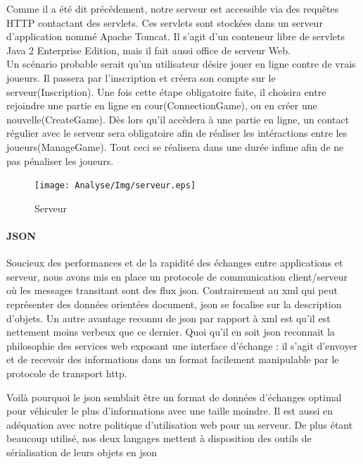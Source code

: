 		
		Comme il a été dit précédement, notre serveur est accessible via des requêtes
		HTTP contactant des servlets. Ces servlets sont stockées dans un serveur
		d'application nommé Apache Tomcat. Il s'agit d'un conteneur libre de
		servlets Java 2 Enterprise Edition, mais il fait aussi office de serveur
		Web.\\
		Un scénario probable serait qu'un utilisateur désire jouer
		en ligne contre de vrais joueurs. 
		Il passera par l'inscription et créera son compte sur le
		serveur(Inscription). Une fois cette étape obligatoire faite, il choisira
		entre rejoindre une partie en ligne en cour(ConnectionGame), ou en créer une nouvelle(CreateGame).
		Dès lors qu'il accèdera à une partie en
		ligne, un contact régulier avec le serveur sera obligatoire afin de réaliser
		les intéractions entre les joueurs(ManageGame). Tout ceci se
		réalisera dans une durée infime afin de ne pas pénaliser les joueurs.	
		
		\begin{figure}
			\texttt{[image: Analyse/Img/serveur.eps]}
			 \caption {Serveur}
		\end{figure}
		
		\newpage
		
		
	\paragraph{JSON\\}	
	
		Soucieux des performances et de la rapidité des échanges entre applications et
		serveur, nous avons mis en place un protocole de communication client/serveur
		où les messages transitant sont des flux \gls{json}. 	
		Contrairement au \gls{xml} qui peut représenter des données orientées document,
		\gls{json} se focalise sur la description d’objets.
		Un autre avantage reconnu de \gls{json} par rapport à \gls{xml} est qu’il est nettement
		moins verbeux que ce dernier.
		Quoi qu’il en soit \gls{json} reconnait la philosophie des services web exposant
		une interface d’échange : il s’agit
		d’envoyer et de recevoir des informations dans un format facilement manipulable par
		le protocole de transport \gls{http}.
		
		
		Voilà pourquoi le \gls{json} semblait être un format de données d'échanges optimal
		pour véhiculer le plus d'informations avec une taille moindre. Il est aussi en
		adéquation avec notre politique d'utilisation web pour un serveur.
		De plus étant beaucoup utilisé, nos deux
		langages mettent à disposition des outils de sérialisation de leurs objets en \gls{json}
		
